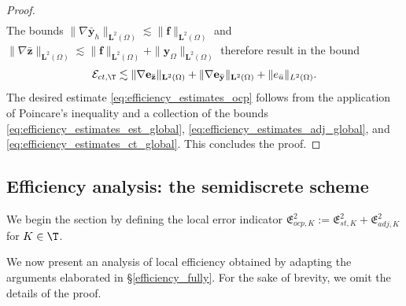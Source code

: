 \documentclass[final]{siamart0216}
\begin{document}
\begin{proof}
\begin{align*}
\end{align*}
The bounds $\|\nabla \bar{\mathbf{y}}_{h}\|_{\mathbf{L}^2(\Omega)}\lesssim \|\mathbf{f}\|_{\mathbf{L}^2(\Omega)}$ and $\|\nabla \bar{\mathbf{z}}\|_{\mathbf{L}^2(\Omega)}\lesssim  \|\mathbf{f}\|_{\mathbf{L}^2(\Omega)}+ \|\mathbf{y}_{\Omega}\|_{\mathbf{L}^2(\Omega)}$ therefore result in the bound
\begin{align}\label{eq:efficiency_estimates_ct_global}
\mathcal{E}_{ct,\T}\lesssim \|\nabla \mathbf{e}_{\bar{\mathbf{z}}}\|_{\mathbf{L}^2(\Omega)}+\|\nabla \mathbf{e}_{\bar{\mathbf{y}}}\|_{\mathbf{L}^2(\Omega)}+\|e_{\bar{u}}\|_{L^2(\Omega)}.
\end{align}
The desired estimate \eqref{eq:efficiency_estimates_ocp} follows from the application of Poincare's inequality and a collection of the bounds \eqref{eq:efficiency_estimates_est_global}, \eqref{eq:efficiency_estimates_adj_global}, and \eqref{eq:efficiency_estimates_ct_global}. This concludes the proof.
\end{proof}

\subsection{Efficiency analysis: the semidiscrete scheme}\label{efficiency_semi}
We begin the section by defining the local error indicator $\mathfrak{E}_{ocp,K}^2:=\mathfrak{E}_{st,K}^2+\mathfrak{E}_{adj,K}^2$ for $K\in\T$.

We now present an analysis of local efficiency obtained by adapting the arguments elaborated in \S\ref{efficiency_fully}. For the sake of brevity, we omit the details of the proof.
\end{document}
